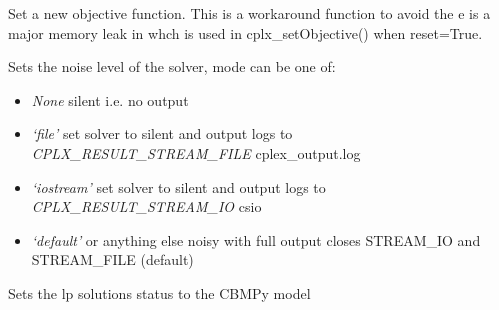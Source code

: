 \documentclass[a4paper,11pt,english]{sphinxmanual}
\begin{document}

\begin{fulllineitems}
\label{modules_doc:cbmpy.CBCPLEX.cplx_setObjective2}
Set a new objective function. This is a workaround function to avoid the
e is a major memory leak in  whch is used
in cplx\_setObjective()  when reset=True.

\end{fulllineitems}


\begin{fulllineitems}
\label{modules_doc:cbmpy.CBCPLEX.cplx_setOutputStreams}
Sets the noise level of the solver, mode can be one of:
\begin{itemize}
\item {} 
\emph{None} silent i.e. no output

\item {} 
\emph{`file'} set solver to silent and output logs to \emph{CPLX\_RESULT\_STREAM\_FILE} cplex\_output.log

\item {} 
\emph{`iostream'} set solver to silent and output logs to \emph{CPLX\_RESULT\_STREAM\_IO} csio

\item {} 
\emph{`default'} or anything else noisy with full output closes STREAM\_IO and STREAM\_FILE (default)

\end{itemize}

\end{fulllineitems}


\begin{fulllineitems}
\label{modules_doc:cbmpy.CBCPLEX.cplx_setSolutionStatusToModel}
Sets the lp solutions status to the CBMPy model

\end{fulllineitems}
\end{document}
